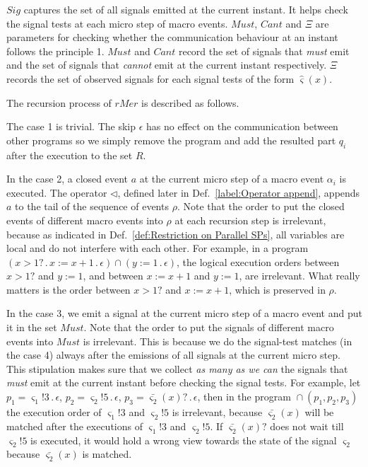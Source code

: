 \documentclass{fcs}
\newcommand{\sig}[0]{\varsigma}
\DeclareMathOperator{\para}{\cap}
\newcommand{\Must}[0]{\mathit{Must}}
\newcommand{\Cannot}[0]{\mathit{Cant}}
\DeclareMathOperator{\nex}{.}
\newcommand{\rMerge}[0]{\mathit{rMer}}
\newcommand{\append}[0]{\triangleleft}
\newcommand{\Sigs}[0]{\mathit{Sig}}
\newcommand{\SV}[0]{\Xi}
\begin{document}
\ifx
$\Sigs$ captures the set of all signals emitted at the current instant.
It helps check the signal tests at each micro step of macro events.
$\Must$, $\Cannot$ and $\SV$ are parameters for checking whether the communication behaviour at an instant follows the principle 1.
$\Must$ and $\Cannot$ record the set of signals that \emph{must} emit and the set of signals that \emph{cannot} emit at the current instant respectively.
$\SV$ records the set of observed signals for each signal tests of the form $\hat{\sig}(x)$.
\fi

The recursion process of $\rMerge$ is described as follows.

The case 1 is trivial. The skip $\epsilon$ has no effect on the communication between other programs so we simply remove the program and add the resulted part $q_i$ after the execution to the set $R$.

In the case 2, a closed event $a$ at the current micro step of a macro event $\alpha_i$ is executed.
The operator $\append$, defined later in Def.~\ref{label:Operator append}, appends $a$ to the tail of the sequence of events $\rho$.
Note that the order to put the closed events of different macro events into $\rho$ at each recursion step is irrelevant, because as indicated in Def.~\ref{def:Restriction on Parallel SPs}, all variables are local and
do not interfere with each other. For example, in a program $(x>1?\nex x := x+1\nex \epsilon)\para (y := 1\nex \epsilon)$,
the logical execution orders between $x>1?$ and $y:=1$, and between $x:=x+1$ and $y:=1$, are irrelevant.
What really matters is the order between $x>1?$ and $x:=x+1$, which is preserved in $\rho$.

In the case 3, we emit a signal at the current micro step of a macro event and put it in the set $\Must$.
Note that the order to put the signals of different macro events into $\Must$ is irrelevant.
This is because we do the signal-test matches (in the case 4) always after the emissions of all signals at the current micro step.
This stipulation makes sure that we collect \emph{as many as we can} the signals that \emph{must} emit at the current instant before checking the signal tests.
For example, let $p_1 = \sig_1!3\nex \epsilon$, $p_2 = \sig_2!5\nex \epsilon$, $p_3 = \bar{\sig_2}(x)?\nex \epsilon$,
then in the program $\para(p_1, p_2, p_3)$ the execution order of $\sig_1!3$ and $\sig_2!5$ is irrelevant, because
$\bar{\sig_2}(x)$ will be matched after the executions of $\sig_1!3$ and $\sig_2!5$.
If $\bar{\sig_2}(x)?$ does not wait till $\sig_2!5$ is executed, it would hold a wrong view towards the state of the signal $\sig_2$ because $\bar{\sig_2}(x)$ is matched.
\end{document}
